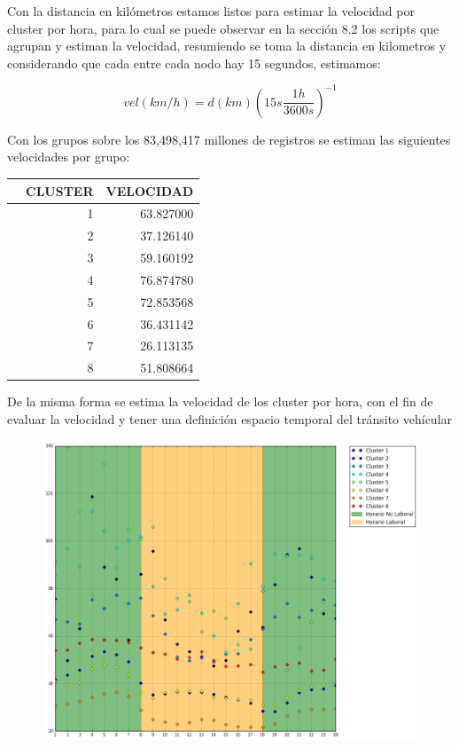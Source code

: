 \documentclass[a4paper]{article}
\begin{document}
Con la distancia en kilómetros estamos listos para estimar la velocidad por cluster por hora, para lo cual se puede observar en  la sección 8.2 los scripts que agrupan y estiman la velocidad, resumiendo se toma la distancia en kilometros y considerando que cada entre cada nodo hay 15 segundos, estimamos:

\begin{displaymath}
vel(km/h)  =  d(km) \left(15s\frac{1h}{3600s}\right)^{-1}
\end{displaymath}

\noindent
Con los grupos sobre los 83,498,417 millones de registros se estiman las siguientes velocidades por grupo:

\begin{center}
\begin{tabular}{crr}
\toprule
{} &  CLUSTER &  VELOCIDAD \\
\midrule
 &        1 &  63.827000 \\
 &        2 &  37.126140 \\
 &        3 &  59.160192 \\
 &        4 &  76.874780 \\
 &        5 &  72.853568 \\
 &        6 &  36.431142 \\
 &        7 &  26.113135 \\
 &        8 &  51.808664 \\
\bottomrule
\end{tabular}
\end{center}

\noindent
De la misma forma se estima la velocidad de los cluster por hora, con el fin de evaluar la velocidad y tener una definición espacio temporal del tránsito vehícular


\begin{center}
\begin{figure}[H]
\includegraphics[scale=.4]{velperclus.png}
\end{figure}
\end{center}
\end{document}
